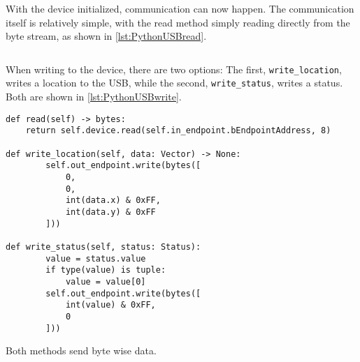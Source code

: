 

With the device initialized, communication can now happen.
The communication itself is relatively simple, with the read method simply reading directly from the byte stream, as shown in \autoref{lst:PythonUSBread}.

\begin{lstlisting}[label={lst:PythonUSBread},caption={Reading from the USB port connected to the NXT}]

\end{lstlisting}

When writing to the device, there are two options:
The first, \texttt{write\_location}, writes a location to the USB, while the second,  \texttt{write\_status}, writes a status.
Both are shown in \autoref{lst:PythonUSBwrite}.

\begin{lstlisting}[label={lst:PythonUSBwrite},caption={Reading and writing from the USB port connected to the NXT}]
    def read(self) -> bytes:
    return self.device.read(self.in_endpoint.bEndpointAddress, 8)

def write_location(self, data: Vector) -> None:
        self.out_endpoint.write(bytes([
            0,
            0,
            int(data.x) & 0xFF,
            int(data.y) & 0xFF
        ]))

def write_status(self, status: Status):
        value = status.value
        if type(value) is tuple:
            value = value[0]
        self.out_endpoint.write(bytes([
            int(value) & 0xFF,
            0
        ]))

\end{lstlisting}
Both methods send byte wise data.

